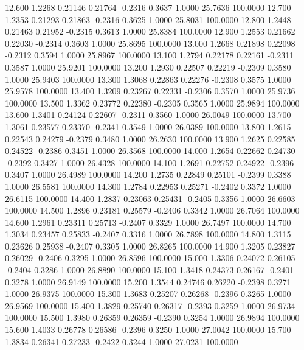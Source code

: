   12.600   1.2268   0.21146   0.21764  -0.2316   0.3637   1.0000  25.7636 100.0000
  12.700   1.2353   0.21293   0.21863  -0.2316   0.3625   1.0000  25.8031 100.0000
  12.800   1.2448   0.21463   0.21952  -0.2315   0.3613   1.0000  25.8384 100.0000
  12.900   1.2553   0.21662   0.22030  -0.2314   0.3603   1.0000  25.8695 100.0000
  13.000   1.2668   0.21898   0.22098  -0.2312   0.3594   1.0000  25.8967 100.0000
  13.100   1.2794   0.22178   0.22161  -0.2311   0.3587   1.0000  25.9201 100.0000
  13.200   1.2930   0.22507   0.22219  -0.2309   0.3580   1.0000  25.9403 100.0000
  13.300   1.3068   0.22863   0.22276  -0.2308   0.3575   1.0000  25.9578 100.0000
  13.400   1.3209   0.23267   0.22331  -0.2306   0.3570   1.0000  25.9736 100.0000
  13.500   1.3362   0.23772   0.22380  -0.2305   0.3565   1.0000  25.9894 100.0000
  13.600   1.3401   0.24124   0.22607  -0.2311   0.3560   1.0000  26.0049 100.0000
  13.700   1.3061   0.23577   0.23370  -0.2341   0.3549   1.0000  26.0389 100.0000
  13.800   1.2615   0.22543   0.24279  -0.2379   0.3480   1.0000  26.2630 100.0000
  13.900   1.2625   0.22585   0.24522  -0.2386   0.3451   1.0000  26.3568 100.0000
  14.000   1.2654   0.22662   0.24730  -0.2392   0.3427   1.0000  26.4328 100.0000
  14.100   1.2691   0.22752   0.24922  -0.2396   0.3407   1.0000  26.4989 100.0000
  14.200   1.2735   0.22849   0.25101  -0.2399   0.3388   1.0000  26.5581 100.0000
  14.300   1.2784   0.22953   0.25271  -0.2402   0.3372   1.0000  26.6115 100.0000
  14.400   1.2837   0.23063   0.25431  -0.2405   0.3356   1.0000  26.6603 100.0000
  14.500   1.2896   0.23181   0.25579  -0.2406   0.3342   1.0000  26.7064 100.0000
  14.600   1.2961   0.23311   0.25713  -0.2407   0.3329   1.0000  26.7497 100.0000
  14.700   1.3034   0.23457   0.25833  -0.2407   0.3316   1.0000  26.7898 100.0000
  14.800   1.3115   0.23626   0.25938  -0.2407   0.3305   1.0000  26.8265 100.0000
  14.900   1.3205   0.23827   0.26029  -0.2406   0.3295   1.0000  26.8596 100.0000
  15.000   1.3306   0.24072   0.26105  -0.2404   0.3286   1.0000  26.8890 100.0000
  15.100   1.3418   0.24373   0.26167  -0.2401   0.3278   1.0000  26.9149 100.0000
  15.200   1.3544   0.24746   0.26220  -0.2398   0.3271   1.0000  26.9375 100.0000
  15.300   1.3683   0.25207   0.26268  -0.2396   0.3265   1.0000  26.9569 100.0000
  15.400   1.3829   0.25740   0.26317  -0.2393   0.3259   1.0000  26.9734 100.0000
  15.500   1.3980   0.26359   0.26359  -0.2390   0.3254   1.0000  26.9894 100.0000
  15.600   1.4033   0.26778   0.26586  -0.2396   0.3250   1.0000  27.0042 100.0000
  15.700   1.3834   0.26341   0.27233  -0.2422   0.3244   1.0000  27.0231 100.0000
